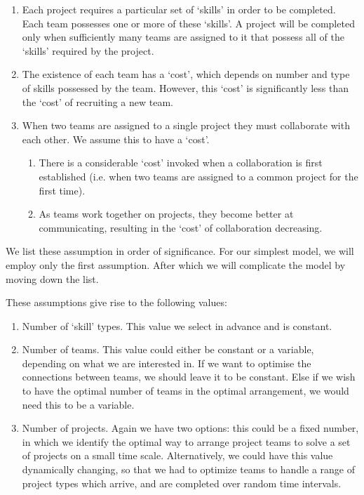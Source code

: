 \begin{enumerate}
	\item Each project requires a particular set of `skills' in order to be completed. Each team possesses one or more of these `skills'. A project will be completed only when sufficiently many teams are assigned to it that possess all of the `skills' required by the project.

	\item The existence of each team has a `cost', which depends on number and type of skills possessed by the team. However, this `cost' is significantly less than the `cost' of recruiting a new team.

	\item When two teams are assigned to a single project they must collaborate with each other. We assume this to have a `cost'. 
	\begin{enumerate}
		\item There is a considerable `cost' invoked when a collaboration is first established (i.e. when two teams are assigned to a common project for the first time). 
		\item As teams work together on projects, they become better at communicating, resulting in the `cost' of collaboration decreasing. 
	\end{enumerate}
	

\end{enumerate}

We list these assumption in order of significance. For our simplest model, we will employ only the first assumption. After which we will complicate the model by moving down the list.

These assumptions give rise to the following values:

\begin{enumerate}
	\item Number of `skill' types. This value we select in advance and is constant.
	\item Number of teams. This value could either be constant or a variable, depending on what we are interested in. If we want to optimise the connections between teams, we should leave it to be constant. Else if we wish to have the optimal number of teams in the optimal arrangement, we would need this to be a variable. 
	\item Number of projects. Again we have two options: this could be a fixed number, in which we identify the optimal way to arrange project teams to solve a set of projects on a small time scale. Alternatively, we could have this value dynamically changing, so that we had to optimize teams to handle a range of project types which arrive, and are completed over random time intervals.
\end{enumerate}


